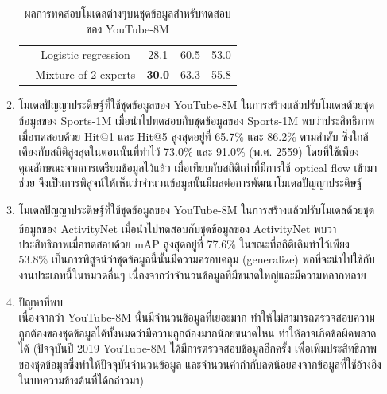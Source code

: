 \begin{enumerate}
\begin{enumerate}
\begin{table}[!ht]
\begin{tabular}{|c|c|c|c|c|}
					& Logistic regression & 28.1 & 60.5 & 53.0\\
					& Mixture-of-2-experts & \textbf{30.0} & 63.3 & 55.8\\
					\hline
				\end{tabular}
				\caption{ผลการทดสอบโมเดลต่างๆบนชุดข้อมูลสำหรับทดสอบของ YouTube-8M}
				\label{tab: youtube_youtube}
			\end{table}
			\clearpage
		\item โมเดลปัญญาประดิษฐ์ที่ใช้ชุดข้อมูลของ YouTube-8M ในการสร้างแล้วปรับโมเดลด้วยชุดข้อมูลของ Sports-1M เมื่อนำไปทดสอบกับชุดข้อมูลของ Sports-1M 
		พบว่าประสิทธิภาพเมื่อทดสอบด้วย Hit@1 และ Hit@5 สูงสุดอยู่ที่ 65.7\% และ 86.2\% ตามลำดับ ซึ่งใกล้เคียงกับสถิติสูงสุดในตอนนั้นที่ทำไว้ 73.0\% และ 91.0\% (พ.ศ. 2559) 
		โดยที่ใช้เพียงคุณลักษณะจากการเตรียมข้อมูลไว้แล้ว เมื่อเทียบกับสถิติเก่าที่มีการใช้ optical flow เข้ามาช่วย จึงเป็นการพิสูจน์ให้เห็นว่าจำนวนข้อมูลนั้นมีผลต่อการพัฒนาโมเดลปัญญาประดิษฐ์
			
		\item โมเดลปัญญาประดิษฐ์ที่ใช้ชุดข้อมูลของ YouTube-8M ในการสร้างแล้วปรับโมเดลด้วยชุดข้อมูลของ ActivityNet\textsuperscript{\cite{caba2015activitynet}}  เมื่อนำไปทดสอบกับชุดข้อมูลของ ActivityNet
		พบว่าประสิทธิภาพเมื่อทดสอบด้วย mAP สูงสุดอยู่ที่ 77.6\% ในขณะที่สถิติเดิมทำไว้เพียง 53.8\% เป็นการพิสูจน์ว่าชุดข้อมูลนี้นั้นมีความครอบคลุม (generalize) 
		พอที่จะนำไปใช้กับงานประเภทนี้ในหมวดอื่นๆ เนื่องจากว่าจำนวนข้อมูลที่มีขนาดใหญ่และมีความหลากหลาย
		
		\item ปัญหาที่พบ\\
		เนื่องจากว่า YouTube-8M นั้นมีจำนวนข้อมูลที่เยอะมาก ทำให้ไม่สามารถตรวจสอบความถูกต้องของชุดข้อมูลได้ทั้งหมดว่ามีความถูกต้องมากน้อยขนาดไหน 
		ทำให้อาจเกิดข้อผิดพลาดได้ (ปัจจุบันปี 2019 YouTube-8M ได้มีการตรวจสอบข้อมูลอีกครั้ง เพื่อเพิ่มประสิทธิภาพของชุดข้อมูลซึ่งทำให้ปัจจุบันจำนวนข้อมูล 
		และจำนวนคำกำกับลดน้อยลงจากข้อมูลที่ใช้อ้างอิงในบทความข้างต้นที่ได้กล่าวมา)
	\end{enumerate}	
\end{enumerate}